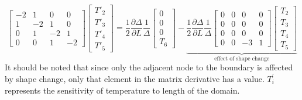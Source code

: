 \begin{equation}\label{eq:C2_laplaceEquationMatrixFormSensitivity}
    \begin{bmatrix}
        -2 & 1 & 0 & 0 \\
        1 & -2 & 1 & 0 \\
        0 & 1 & -2 & 1 \\
        0 & 0 & 1 & -2
    \end{bmatrix}
    \begin{bmatrix}
        T'_2 \\
        T'_3 \\
        T'_4 \\
        T'_5
    \end{bmatrix}
    =
    \frac{1}{2} \frac{\partial \Delta}{\partial L} \frac{1}{\Delta}
    \begin{bmatrix}
        0 \\
        0 \\
        0 \\
        T_6
    \end{bmatrix}
    -
    \underbrace{
    \frac{1}{2} \frac{\partial \Delta}{\partial L} \frac{1}{\Delta}
    \begin{bmatrix}
        0 & 0 & 0 & 0 \\
        0 & 0 & 0 & 0 \\
        0 & 0 & 0 & 0 \\
        0 & 0 & -3 & 1
    \end{bmatrix}
    \begin{bmatrix}
        T_2 \\
        T_3 \\
        T_4 \\
        T_5
    \end{bmatrix}}_\text{effect of shape change}
\end{equation}
%
It should be noted that since only the adjacent node to the boundary is affected by shape change, only that element in the matrix derivative has a value. $T^\prime_i$ represents the sensitivity of temperature to length of the domain.

